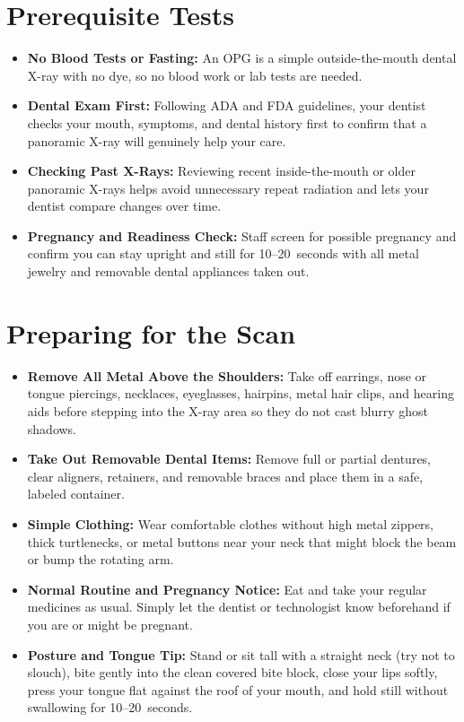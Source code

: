\section{Prerequisite Tests}
\begin{itemize}
\item \textbf{No Blood Tests or Fasting:} An OPG is a simple outside-the-mouth dental X-ray with no dye, so no blood work or lab tests are needed.
\item \textbf{Dental Exam First:} Following ADA and FDA guidelines, your dentist checks your mouth, symptoms, and dental history first to confirm that a panoramic X-ray will genuinely help your care.
\item \textbf{Checking Past X-Rays:} Reviewing recent inside-the-mouth or older panoramic X-rays helps avoid unnecessary repeat radiation and lets your dentist compare changes over time.
\item \textbf{Pregnancy and Readiness Check:} Staff screen for possible pregnancy and confirm you can stay upright and still for 10--20~seconds with all metal jewelry and removable dental appliances taken out.
\end{itemize}

\section{Preparing for the Scan}
\begin{itemize}
\item \textbf{Remove All Metal Above the Shoulders:} Take off earrings, nose or tongue piercings, necklaces, eyeglasses, hairpins, metal hair clips, and hearing aids before stepping into the X-ray area so they do not cast blurry ghost shadows.
\item \textbf{Take Out Removable Dental Items:} Remove full or partial dentures, clear aligners, retainers, and removable braces and place them in a safe, labeled container.
\item \textbf{Simple Clothing:} Wear comfortable clothes without high metal zippers, thick turtlenecks, or metal buttons near your neck that might block the beam or bump the rotating arm.
\item \textbf{Normal Routine and Pregnancy Notice:} Eat and take your regular medicines as usual. Simply let the dentist or technologist know beforehand if you are or might be pregnant.
\item \textbf{Posture and Tongue Tip:} Stand or sit tall with a straight neck (try not to slouch), bite gently into the clean covered bite block, close your lips softly, press your tongue flat against the roof of your mouth, and hold still without swallowing for 10--20~seconds.
\end{itemize}

